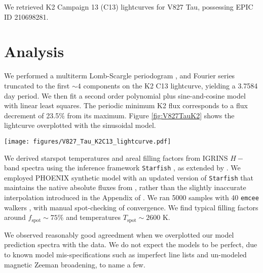\documentclass[twocolumn]{emulateapj}%
\begin{document}
We retrieved K2 Campaign 13 (C13) \cite{2014PASP..126..398H} lightcurves for V827 Tau, possessing EPIC ID 210698281.


\section{Analysis}\label{sec:Analysis}
 We performed a multiterm Lomb-Scargle periodogram \citep{ivezic14}, and Fourier series truncated to the first $\sim 4$ components \citep{vanderplas15a} on the K2 C13 lightcurve, yielding a 3.7584 day period.  We then fit a second order polynomial plus sine-and-cosine model with linear least squares.  The periodic minimum K2 flux corresponds to a flux decrement of 23.5\% from its maximum.  Figure \ref{fig:V827TauK2} shows the lightcurve overplotted with the sinusoidal model.

 \begin{figure*}
 \centering
 \texttt{[image: figures/V827\_Tau\_K2C13\_lightcurve.pdf]}
 \caption{K2 C13 lightcurve of V827 Tau with a polynomial and sinusoidal model overplotted.  A few flares are perceptible.}
 \label{fig:V827TauK2}
\end{figure*}

We derived starspot temperatures and areal filling factors from IGRINS $H-$band spectra using the inference framework \texttt{Starfish} \citep{czekala15}, as extended by \citet{2017ApJ...836..200G}.  We employed PHOENIX synthetic model with an updated version of \texttt{Starfish} that maintains the native absolute fluxes from \citet{husser13}, rather than the slightly inaccurate interpolation introduced in the Appendix of \citet{2017ApJ...836..200G}.  We ran 5000 samples with 40 \texttt{emcee} walkers \citep{foreman13}, with manual spot-checking of convergence.  We find typical filling factors around $f_\mathrm{spot} \sim 75\%$ and temperatures $T_\mathrm{spot} \sim 2600$ K.

We observed reasonably good agreedment when we overplotted our model prediction spectra with the data.  We do not expect the models to be perfect, due to known model mis-specifications such as imperfect line lists and un-modeled magnetic Zeeman broadening, to name a few.
\end{document}
